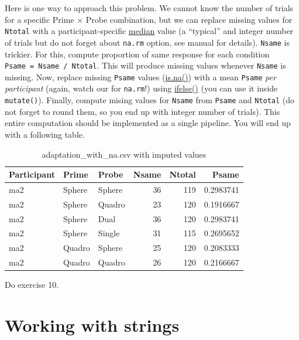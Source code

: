 \documentclass[
]{book}
\begin{document}
Here is one way to approach this problem. We cannot know the number of trials for a specific Prime × Probe combination, but we can replace missing values for \texttt{Ntotal} with a participant-specific \href{https://stat.ethz.ch/R-manual/R-devel/library/stats/html/median.html}{median} value (a ``typical'' and integer number of trials but do not forget about \texttt{na.rm} option, see manual for details). \texttt{Nsame} is trickier. For this, compute proportion of same response for each condition \texttt{Psame\ =\ Nsame\ /\ Ntotal}. This will produce missing values whenever \texttt{Nsame} is missing. Now, replace missing \texttt{Psame} values (\href{https://stat.ethz.ch/R-manual/R-devel/library/base/html/NA.html}{is.na()}) with a mean \texttt{Psame} \emph{per participant} (again, watch our for \texttt{na.rm}!) using \href{https://stat.ethz.ch/R-manual/R-devel/library/base/html/ifelse.html}{ifelse()} (you can use it inside \texttt{mutate()}). Finally, compute mising values for \texttt{Nsame} from \texttt{Psame} and \texttt{Ntotal} (do not forget to round them, so you end up with integer number of trials). This entire computation should be implemented as a single pipeline. You will end up with a following table.

\begin{table}

\caption{\label{tab:unnamed-chunk-292}adaptation\_with\_na.csv with imputed values}
\centering
\begin{tabular}[t]{l|l|l|r|r|r}
\hline
Participant & Prime & Probe & Nsame & Ntotal & Psame\\
\hline
ma2 & Sphere & Sphere & 36 & 119 & 0.2983741\\
\hline
ma2 & Sphere & Quadro & 23 & 120 & 0.1916667\\
\hline
ma2 & Sphere & Dual & 36 & 120 & 0.2983741\\
\hline
ma2 & Sphere & Single & 31 & 115 & 0.2695652\\
\hline
ma2 & Quadro & Sphere & 25 & 120 & 0.2083333\\
\hline
ma2 & Quadro & Quadro & 26 & 120 & 0.2166667\\
\hline
\end{tabular}
\end{table}

Do exercise 10.

\hypertarget{strings}{%
\chapter{Working with strings}\label{strings}}
\end{document}
